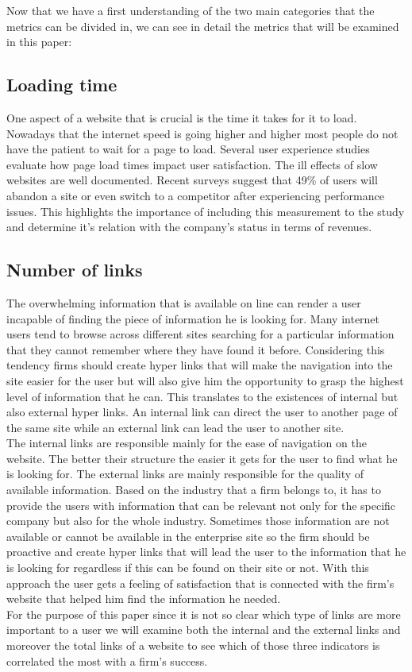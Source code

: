 \documentclass{book}
\begin{document}
Now that we have a first understanding of the two main categories that the metrics can be divided in, we can see in detail the metrics that will be examined in this paper:
\subsection{Loading time}\label{M:Loading time}
One aspect of a website that is crucial is the time it takes for it to load. Nowadays that the internet speed is going higher and higher most people do not have the patient to wait for a page to load. Several user experience studies evaluate how page load times impact user satisfaction. The ill effects of slow websites are well documented. Recent surveys suggest that 49\% of users will abandon a site or even switch to a competitor after experiencing performance issues. This highlights the importance of including this measurement to the study and determine it's relation with the company's status in terms of revenues.
\subsection{Number of links}\label{M:Number of links}
The overwhelming information that is available on line can render a user incapable of finding the piece of information he is looking for. Many internet users tend to browse across different sites searching for a particular information that they cannot remember where they have found it before. Considering this tendency firms should create hyper links that will make the navigation into the site easier for the user but will also give him the opportunity to grasp the highest level of information that he can. This translates to the existences of internal but also external hyper links. An internal link can direct the user to another page of the same site while an external link can lead the user to another site.\\
The internal links are responsible mainly for the ease of navigation on the website. The better their structure the easier it gets for the user to find what he is looking for. The external links are mainly responsible for the quality of available information. Based on the industry that a firm belongs to, it has to provide the users with information that can be relevant not only for the specific company but also for the whole industry. Sometimes those information are not available or cannot be available in the enterprise site so the firm should be proactive and create hyper links that will lead the user to the information that he is looking for regardless if this can be found on their site or not. With this approach the user gets a feeling of satisfaction that is connected with the firm's website that helped him find the information he needed.\\
For the purpose of this paper since it is not so clear which type of links are more important to a user we will examine both the internal and the external links and moreover the total links of a website to see which of those three indicators is correlated the most with a firm's success.
\end{document}
